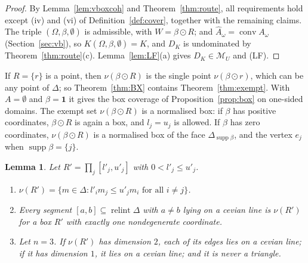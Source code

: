 \documentclass[11pt]{article}
\newcommand{\one}{\mathbf{1}}
\newcommand{\M}{\mathcal{M}}
\DeclareMathOperator{\conv}{conv}
\DeclareMathOperator{\relint}{relint}
\DeclareMathOperator{\supp}{supp}
\theoremstyle{plain}
\newtheorem{lemma}[theorem]{Lemma}
\theoremstyle{definition}
\theoremstyle{remark}
\begin{document}
\begin{proof}
By Lemma~\ref{lem:vboxcoh} and Theorem~\ref{thm:route}, all requirements hold except (iv)
and (vi) of Definition~\ref{def:cover}, together with the remaining claims. The triple
$(\Omega,\beta,\emptyset)$ is admissible, with $W=\beta\odot R$; and $\hat A_\omega=\conv
A_\omega$ (Section~\ref{sec:vb}), so $K(\Omega,\beta,\emptyset)=K$, and $D_K$ is
undominated by Theorem~\ref{thm:route}(c). Lemma~\ref{lem:LF}(a) gives $D_K\in\M_U$ and
(LF).
\end{proof}

If $R=\{r\}$ is a point, then $\nu(\beta\odot R)$ is the single point $\nu(\beta\odot r)$,
which can be any point of $\Delta$; so Theorem~\ref{thm:BX} contains
Theorem~\ref{thm:exempt}. With $A=\emptyset$ and $\beta=\one$ it gives the box coverage of
Proposition~\ref{prop:box} on one-sided domains. The exempt set $\nu(\beta\odot R)$ is a
normalised box: if $\beta$ has positive coordinates, $\beta\odot R$ is again a box, and
$l_j=u_j$ is allowed. If $\beta$ has zero coordinates, $\nu(\beta\odot R)$ is a normalised
box of the face $\Delta_{\supp\beta}$, and the vertex $e_j$ when $\supp\beta=\{j\}$.

\begin{lemma}\label{lem:boxgeom}
Let $R'=\prod_j[l'_j,u'_j]$ with $0<l'_j\le u'_j$.
\begin{enumerate}[label=(\alph*)]
  \item $\nu(R')=\{m\in\Delta:l'_im_j\le u'_jm_i\text{ for all }i\ne j\}$.
  \item Every segment $[a,b]\subseteq\relint\Delta$ with $a\ne b$ lying on a cevian line
  is $\nu(R')$ for a box $R'$ with exactly one nondegenerate coordinate.
  \item Let $n=3$. If $\nu(R')$ has dimension $2$, each of its edges lies on a cevian line;
  if it has dimension $1$, it lies on a cevian line; and it is never a triangle.
\end{enumerate}
\end{lemma}
\end{document}
